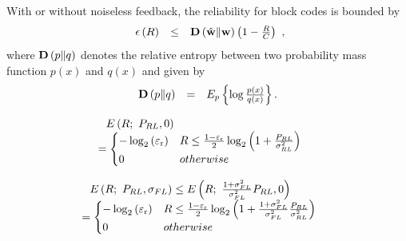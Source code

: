 \documentclass[10pt,fleqn, twocolumn]{IEEEtran}
\newcommand{\bw}{{\bf w}}
\newcommand{\bD}{{\bf D}}
\begin{document}
With or without noiseless feedback, the reliability for block
codes is bounded by
\begin{equation}
\begin{array}{rcl}
\epsilon\left(R\right)&\leq&\bD\left(\hat{\bw}\|\bw\right)\left(1-\frac{R}{C}\right)
\end{array},
\end{equation}
\noindent where $\bD\left(p\| q\right)$ denotes the relative
entropy between two probability mass function $p\left(x\right)$
and $q\left(x\right)$ and given by
\begin{equation}\hspace{-0.0in}
\begin{array}{rcl}
\bD\left(p\|
q\right)&=&E_{p}\left\{\log\frac{p\left(x\right)}{q\left(x\right)}\right\}.
\end{array}
\end{equation}


\begin{equation}\hspace{-0.1in}
\begin{array}{l}
E\left(R;\ P_{\mbox{\tiny RL}},0\right)\\
\hspace{-0.10in}=\begin{cases} -\log_{2}\left(\varepsilon_{\rm
r}\right) & R \leq \frac{1-\varepsilon_{\rm
r}}{2}\log_{2}\left(1+\frac{P_{\mbox{\tiny
RL}}}{\sigma_{\mbox{\tiny RL}}^{2}}\right) \\
0 & \mbox{otherwise}
\end{cases}
\end{array}
\end{equation}




\begin{equation}\hspace{-0.10in}
\begin{array}{l}
E\left(R;\ P_{\mbox{\tiny RL}},\sigma_{\mbox{\tiny FL}}\right)\leq
E\left(R;\ \frac{1+\sigma_{\mbox{\tiny
FL}}^{2}}{\sigma_{\mbox{\tiny FL}}^{2}}P_{\mbox{\tiny
RL}}, 0\right)\\
\hspace{-0.10in}=\begin{cases} -\log_{2}\left(\varepsilon_{\rm
r}\right) & R \leq \frac{1-\varepsilon_{\rm
r}}{2}\log_{2}\left(1+\frac{1+\sigma_{\mbox{\tiny
FL}}^{2}}{\sigma_{\mbox{\tiny FL}}^{2}}\frac{P_{\mbox{\tiny
RL}}}{\sigma_{\mbox{\tiny RL}}^{2}}\right) \\
0 & \mbox{otherwise}
\end{cases}
\end{array}
\end{equation}
\end{document}
